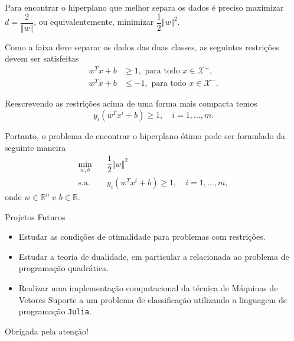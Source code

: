 \documentclass{beamer}
\def\Xset{\mathcal{X}}
\def\RR{\mathds{R}}
\theoremstyle{definition}%
\begin{document}
\begin{frame}
Para encontrar o hiperplano que melhor separa os dados é preciso maximizar $d=\dfrac{2}{\Vert w\Vert }$, ou equivalentemente, minimizar $\dfrac{1}{2}\Vert w\Vert^{2}$. 

Como a faixa deve separar os dados das duas classes, as seguintes restrições devem ser satisfeitas
\begin{align}
w^{T}x+b &\geq 1 , \text{ para  todo } x\in \Xset^{+}, \\
w^{T}x+b &\leq -1 , \text{ para  todo } x\in \Xset^{-}.
\end{align}

Reescrevendo as restrições acima de uma forma mais compacta temos
\[ y_{i}(w^{T}x^{i}+b)\geq 1, \quad i=1, \ldots ,m. \]
\end{frame}


\begin{frame}
Portanto, o problema de encontrar o hiperplano ótimo pode ser formulado da seguinte maneira
\[ \label{eq5}
\begin{aligned}
\min_{w,b} & \quad \dfrac{1}{2} \Vert w\Vert^{2} \\
\text{s.a.} &  \quad y_i(w^{T}x^{i}+b) \geq 1, \quad i=1, \ldots , m, \end{aligned}
\]
onde $w\in \RR^{n}$ e $b\in \RR$. 
\end{frame}


\begin{frame}{Projetos Futuros}
\begin{itemize}
	\item Estudar as condições de otimalidade para problemas com restrições.

	\item Estudar a teoria de dualidade, em particular a relacionada ao problema de programação quadrática.

	\item Realizar uma implementação computacional da técnica de Máquinas de Vetores Suporte a um problema de classificação utilizando a linguagem de programação \texttt{Julia}.
\end{itemize}
\end{frame}


\begin{frame}
\centering
\Large{Obrigada pela atenção!}
\end{frame}


\begin{frame}
\printbibliography
\end{frame}
\end{document}
